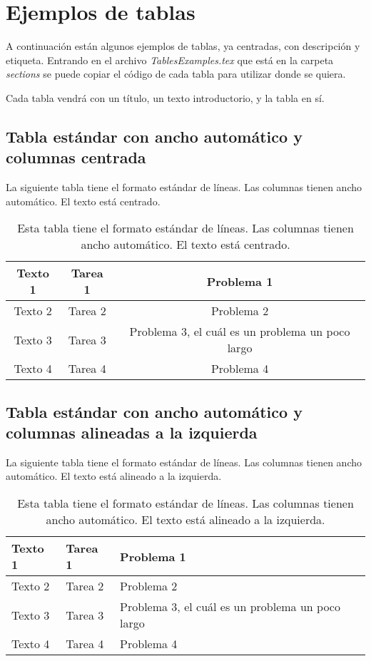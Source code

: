 \chapter{Ejemplos de tablas}

A continuación están algunos ejemplos de tablas, ya centradas, con descripción y etiqueta. Entrando en el archivo \textit{TablesExamples.tex} que está en la carpeta \textit{sections} se puede copiar el código de cada tabla para utilizar donde se quiera.

Cada tabla vendrá con un título, un texto introductorio, y la tabla en sí.

\section*{Tabla estándar con ancho automático y columnas centrada}

La siguiente tabla tiene el formato estándar de líneas. Las columnas tienen ancho automático. El texto está centrado.

\begin{table}[h]
	\centering
	\begin{tabular}{|c|c|c|}
		\hline
		Texto 1 & Tarea 1 & Problema 1 \\
		\hline
		Texto 2 & Tarea 2 & Problema 2 \\
		\hline
		Texto 3 & Tarea 3 & Problema 3, el cuál es un problema un poco largo \\
		\hline
		Texto 4 & Tarea 4 & Problema 4 \\
		\hline
	\end{tabular}
	\caption[Tabla estándar con ancho automático y columnas centradas]{Esta tabla tiene el formato estándar de líneas. Las columnas tienen ancho automático. El texto está centrado.}
	\label{table1}
\end{table}

\section*{Tabla estándar con ancho automático y columnas alineadas a la izquierda}

La siguiente tabla tiene el formato estándar de líneas. Las columnas tienen ancho automático. El texto está alineado a la izquierda.

\begin{table}[h]
	\centering
	\begin{tabular}{|l|l|l|}
		\hline
		Texto 1 & Tarea 1 & Problema 1 \\
		\hline
		Texto 2 & Tarea 2 & Problema 2 \\
		\hline
		Texto 3 & Tarea 3 & Problema 3, el cuál es un problema un poco largo \\
		\hline
		Texto 4 & Tarea 4 & Problema 4 \\
		\hline
	\end{tabular}
	\caption[Tabla estándar con ancho automático y columnas alineadas a la izquierda]{Esta tabla tiene el formato estándar de líneas. Las columnas tienen ancho automático. El texto está alineado a la izquierda.}
	\label{table2}
\end{table}

